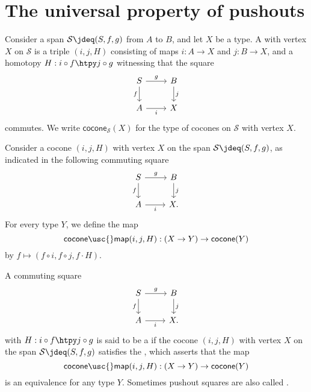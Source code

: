 \section{The universal property of pushouts}

\begin{defn}
Consider a span $\mathcal{S}\jdeq (S,f,g)$ from $A$ to $B$, and let $X$ be a type.
A  with vertex $X$ on $\mathcal{S}$ is a triple $(i,j,H)$ consisting of maps $i:A\to X$ and $j:B\to X$, and a homotopy $H:i\circ f\htpy j\circ g$ witnessing that the square
\begin{equation*}
\begin{tikzcd}
S \arrow[r,"g"] \arrow[d,swap,"f"] & B \arrow[d,"j"] \\
A \arrow[r,swap,"i"] & X
\end{tikzcd}
\end{equation*}
commutes.
We write $\mathsf{cocone}_{\mathcal{S}}(X)$ for the type of cocones on $\mathcal{S}$ with vertex $X$.
\end{defn}

\begin{defn}
Consider a cocone $(i,j,H)$ with vertex $X$ on the span $\mathcal{S}\jdeq (S,f,g)$, as indicated in the following commuting square
\begin{equation*}
\begin{tikzcd}
S \arrow[r,"g"] \arrow[d,swap,"f"] & B \arrow[d,"j"] \\
A \arrow[r,swap,"i"] & X.
\end{tikzcd}
\end{equation*}
For every type $Y$, we define the map
\begin{equation*}
\mathsf{cocone\usc{}map}(i,j,H):(X\to Y)\to \mathsf{cocone}(Y)
\end{equation*}
by $f\mapsto (f\circ i,f\circ j,f\cdot H)$.
\end{defn}

\begin{defn}
A commuting square
\begin{equation*}
\begin{tikzcd}
S \arrow[r,"g"] \arrow[d,swap,"f"] & B \arrow[d,"j"] \\
A \arrow[r,swap,"i"] & X.
\end{tikzcd}
\end{equation*}
with $H:i\circ f \htpy j\circ g$ is said to be a  if the cocone $(i,j,H)$ with vertex $X$ on the span $\mathcal{S}\jdeq (S,f,g)$
satisfies the , which asserts that the map
\begin{equation*}
\mathsf{cocone\usc{}map}(i,j,H):(X\to Y)\to \mathsf{cocone}(Y)
\end{equation*}
is an equivalence for any type $Y$. Sometimes pushout squares are also called .
\end{defn}

